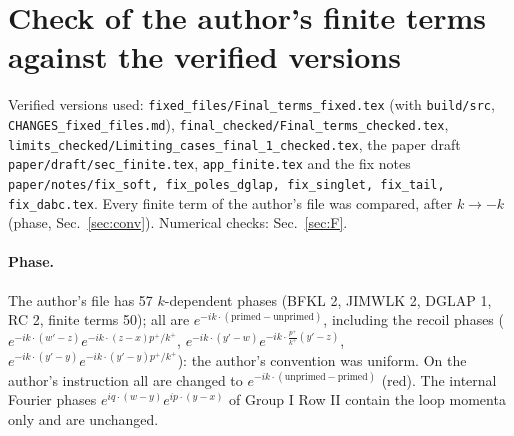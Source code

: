 \section{Check of the author's finite terms against the verified versions}\label{sec:A}
\sloppy
\noindent Verified versions used: \texttt{fixed\_files/Final\_terms\_fixed.tex} (with \texttt{build/src}, \texttt{CHANGES\_fixed\_files.md}), \texttt{final\_checked/Final\_terms\_checked.tex}, \texttt{limits\_checked/Limiting\_cases\_final\_1\_checked.tex}, the paper draft \texttt{paper/draft/sec\_finite.tex}, \texttt{app\_finite.tex} and the fix notes \texttt{paper/notes/fix\_soft, fix\_poles\_dglap, fix\_singlet, fix\_tail, fix\_dabc.tex}. Every finite term of the author's file was compared, after $k\to-k$ (phase, Sec.~\ref{sec:conv}). Numerical checks: Sec.~\ref{sec:F}.

\paragraph{Phase.} The author's file has 57 $k$-dependent phases (BFKL 2, JIMWLK 2, DGLAP 1, RC 2, finite terms 50); all are $e^{-ik\cdot(\text{primed}-\text{unprimed})}$, including the recoil phases ($e^{-ik\cdot(w'-z)}e^{-ik\cdot(z-x)p^{+}/k^{+}}$, $e^{-ik\cdot(y'-w)}e^{-ik\cdot\frac{p^{+}}{k^{+}}(y'-z)}$, $e^{-ik\cdot(y'-y)}e^{-ik\cdot(y'-y)p^{+}/k^{+}}$): the author's convention was uniform. On the author's instruction all are changed to $e^{-ik\cdot(\text{unprimed}-\text{primed})}$ (red). The internal Fourier phases $e^{iq\cdot(w-y)}e^{ip\cdot(y-x)}$ of Group I Row II contain the loop momenta only and are unchanged.

